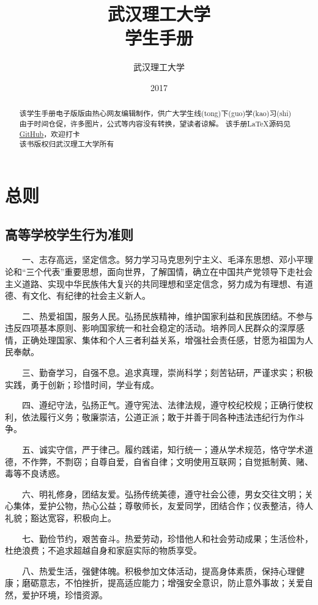 \documentclass[UTF8,12pt,a4paper]{report}
\title{\textbf{武汉理工大学} \\ \textbf{学生手册}}
\author{武汉理工大学}
\date{2017}
\begin{document}
	
	\maketitle
\begin{abstract}
该学生手册电子版版由热心网友编辑制作，供广大学生线(tong)下(guo)学(kao)习(shi)\\
由于时间仓促，许多图片，公式等内容没有转换，望读者谅解。
该手册\LaTeX 源码见 \href{https://github.com/Markhng/WHUT-Student-Handbook/}{\underline{GitHub}}，欢迎打卡\\
该书版权归武汉理工大学所有
\end{abstract}
	\tableofcontents
\part{总则}
\chapter{高等学校学生行为准则}
　　一、志存高远，坚定信念。努力学习马克思列宁主义、毛泽东思想、邓小平理论和“三个代表”重要思想，面向世界，了解国情，确立在中国共产党领导下走社会主义道路、实现中华民族伟大复兴的共同理想和坚定信念，努力成为有理想、有道德、有文化、有纪律的社会主义新人。

　　二、热爱祖国，服务人民。弘扬民族精神，维护国家利益和民族团结。不参与违反四项基本原则、影响国家统一和社会稳定的活动。培养同人民群众的深厚感情，正确处理国家、集体和个人三者利益关系，增强社会责任感，甘愿为祖国为人民奉献。

　　三、勤奋学习，自强不息。追求真理，崇尚科学；刻苦钻研，严谨求实；积极实践，勇于创新；珍惜时间，学业有成。

　　四、遵纪守法，弘扬正气。遵守宪法、法律法规，遵守校纪校规；正确行使权利，依法履行义务；敬廉崇洁，公道正派；敢于并善于同各种违法违纪行为作斗争。

　　五、诚实守信，严于律己。履约践诺，知行统一；遵从学术规范，恪守学术道德，不作弊，不剽窃；自尊自爱，自省自律；文明使用互联网；自觉抵制黄、赌、毒等不良诱惑。

　　六、明礼修身，团结友爱。弘扬传统美德，遵守社会公德，男女交往文明；关心集体，爱护公物，热心公益；尊敬师长，友爱同学，团结合作；仪表整洁，待人礼貌；豁达宽容，积极向上。

　　七、勤俭节约，艰苦奋斗。热爱劳动，珍惜他人和社会劳动成果；生活俭朴，杜绝浪费；不追求超越自身和家庭实际的物质享受。

　　八、热爱生活，强健体魄。积极参加文体活动，提高身体素质，保持心理健康；磨砺意志，不怕挫折，提高适应能力；增强安全意识，防止意外事故；关爱自然，爱护环境，珍惜资源。	
\end{document}
